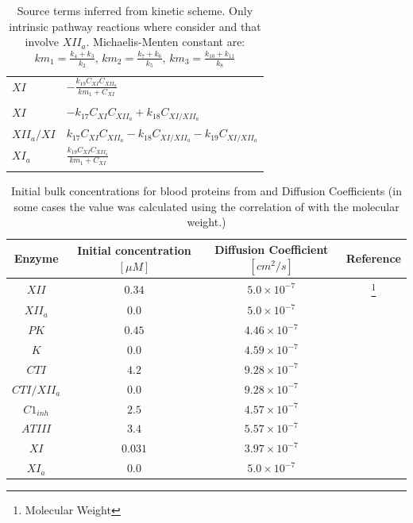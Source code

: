 \documentclass[%
 nofootinbib,
 amsmath,amssymb,
 aps,
 pra,
]{revtex4-1}
\begin{document}
\begin{table}[h]
\begin{tabular}{p{2.5 cm}  p{13 cm}}
$XI$ & $-\frac{k_{19}C_{XI}C_{XII_{a}}}{km_{1}+C_{XI}}$\\\\
$XI$ & $-k_{17}C_{XI}C_{XII_{a}} + k_{18}C_{XI/XII_{a}} $ \\
$XII_{a} / XI$ & $k_{17}C_{XI}C_{XII_{a}}-k_{18}C_{XI/XII_{a}} - k_{19} C_{XI/XII_{a}}  $\\
$XI_{a}$ & $\frac{k_{19}C_{XI}C_{XII_{a}}}{km_{1}+C_{XI}}$\\\\
\hline
\end{tabular}
\caption{\label{Tab:Sourceterms} Source terms inferred from \citet{Chatterjee:2010} kinetic scheme. Only intrinsic pathway reactions where consider and that involve $XII_{a}$. Michaelis-Menten constant are: $km_{1} = \frac{k_{4}+k_{3}}{k_{2}}$, $km_{2} = \frac{k_{7}+k_{6}}{k_{5}}$, $km_{3} = \frac{k_{10}+k_{11}}{k_{8}}$} 
\end{table}
\begin{table}[h]
\begin{tabular}{c c c c}
\hline
Enzyme & Initial concentration $[\mu M]$ & Diffusion Coefficient $ [cm^{2} / s] $ & Reference \\
\hline
$XII$ & $ 0.34$ & $ 5.0 \times 10^{-7} $  & \cite{Furie:1988} \footnote{Molecular Weight} \\
$XII_{a}$ & $0.0$ & $ 5.0 \times 10^{-7} $ & \cite{Furie:1988} \\
$PK$ & $0.45$ & $4.46 \times 10^{-7} $ & \cite{Kirk_1977} \\
$K$ & $0.0$ & $4.59 \times 10^{-7} $ & \cite{Kirk_1977} \\
$CTI$ & $4.2$ & $9.28 \times 10^{-7}$ & \cite{Swartz:1977} \\
$CTI/XII_{a}$ & $0.0$ & $9.28 \times 10^{-7}$  & \cite{Swartz:1977} \\
$C1_{inh}$ & $2.5$ & $4.57 \times 10^{-7}$  & \cite{AlAbdullah:1985} \\
$ATIII$ & $3.4$ & $5.57 \times 10^{-7} $ & \cite{Anand:2003} \\
$XI$ & $0.031$ & $3.97 \times 10^{-7}  $ & \cite{Anand:2003} \\
$XI_{a}$ & $0.0$ & $5.0 \times 10^{-7} $ & \cite{Anand:2003} \\
\hline
\end{tabular}
\caption{\label{Tab:Initial_Concentrations}Initial bulk concentrations for blood proteins from \cite{Chatterjee:2010} and Diffusion Coefficients (in some cases the value was calculated using the correlation of \cite{Young} with the molecular weight.)}
\end{table}
\end{document}

